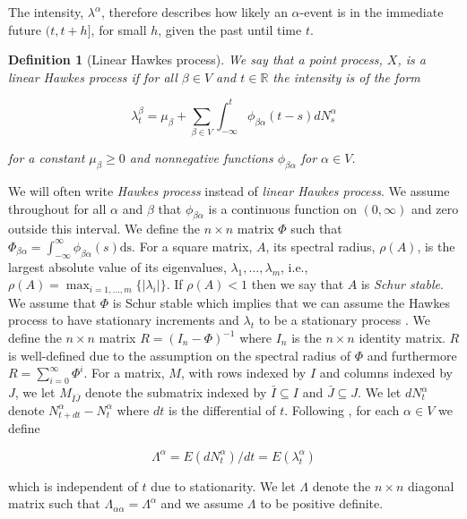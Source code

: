 \documentclass[accepted]{uai2021} %
\newtheorem{defn}[thm]{Definition}
\newcommand{\ds}{\text{ds}}
\begin{document}
The intensity, $\lambda^\alpha$, therefore describes how likely an 
$\alpha$-event is in the immediate future $(t, t+h]$, for small $h$, given the 
past until time $t$.

\begin{defn}[Linear Hawkes process]
	We say that a point process, $X$, is a \emph{linear Hawkes process} if for 
	all $\beta\in V$ and $t\in \mathbb{R}$ the 
	intensity is of the form
	
	$$
	\lambda_t^\beta = \mu_\beta + \sum_{\beta \in V} \int_{-\infty}^{t} 
	\phi_{\beta\alpha}(t - s) d 
	N_s^\alpha
	$$
	
	\noindent for a constant $\mu_\beta \geq 0$ and nonnegative functions 
	$\phi_{\beta\alpha}$ for $\alpha \in V$.
	\label{def:hawProc}
\end{defn}

We will often write \emph{Hawkes process} instead of \emph{linear Hawkes 
process}. 
We assume throughout for all 
$\alpha$ and $\beta$ that $\phi_{\beta\alpha}$ is a continuous 
function on $(0, \infty)$ and zero outside this interval. We define the 
$n\times n$ matrix $\Phi$ such that $\Phi_{\beta\alpha} = 
\int_{-\infty}^\infty 
\phi_{\beta\alpha}(s) \ds$. For a square matrix, $A$, its spectral radius, 
$\rho(A)$, is the largest absolute value of its eigenvalues, 
$\lambda_1,\ldots,\lambda_m$, i.e., $\rho(A) = \max_{i = 1,\ldots,m}\{\vert 
\lambda_i \vert \}$. If $\rho(A) < 1$ then we say that 
$A$ is \emph{Schur stable}. We assume that $\Phi$ is Schur stable which implies 
that we can 
assume the Hawkes process to have stationary increments and $\lambda_t$ to be a 
stationary process \citep{jovanovic2015, bacry2016}.
We define the $n\times n$ matrix $R=(I_n - \Phi)^{-1}$ where $I_n$ is the 
$n\times n$ identity matrix. $R$ is well-defined due to the assumption on 
the spectral radius of $\Phi$ and furthermore $R = \sum_{i=0}^\infty \Phi^i$. 
For a matrix, $M$, with rows indexed by $I$ and columns indexed by $J$, we let 
$M_{\bar{I}\bar{J}}$ denote the submatrix indexed by $\bar{I}\subseteq I$ and 
$\bar{J}\subseteq J$. We let $dN_t^\alpha$ denote $N_{t+dt}^\alpha - 
N_t^\alpha$ where $dt$ is the 
differential of $t$. 
Following \cite{hawkesJRSSB1971}, for each $\alpha\in V$ we define

$$
\Lambda^\alpha = E(dN_t^\alpha)/dt = E(\lambda_t^\alpha)
$$

\noindent which is independent of $t$ due to stationarity. We let $\Lambda$ 
denote the $n\times n$ diagonal matrix such that $\Lambda_{\alpha\alpha} = 
\Lambda^\alpha$ and we assume $\Lambda$ to be positive definite.
\end{document}
